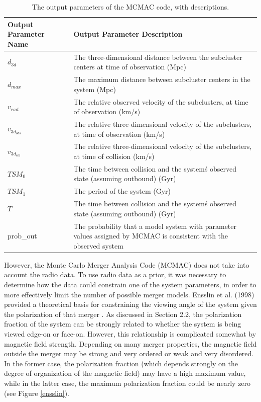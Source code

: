 \documentclass[12 pt]{article}
\renewcommand{\baselinestretch}{2}
\begin{document}
\renewcommand{\baselinestretch}{1}
\begin{table}
\begin{tabular}{|p{1.75in}|p{4in}|} \hline
\textbf{Output Parameter Name} & \textbf{Output Parameter Description} \\ \hline
$d_{3d}$ & The three-dimensional distance between the subcluster centers at time of observation (Mpc) \\ \hline
$d_{max}$ & The maximum distance between subcluster centers in the system (Mpc) \\ \hline
$v_{rad}$ & The relative observed velocity of the subclusters, at time of observation (km/s) \\ \hline
$v_{3d_{obs}}$ & The relative three-dimensional velocity of the subclusters, at time of observation (km/s) \\ \hline
$v_{3d_{col}}$ & The relative three-dimensional velocity of the subclusters, at time of collision (km/s) \\ \hline
$TSM_0$ & The time between collision and the system\'s observed state (assuming outbound) (Gyr) \\ \hline
$TSM_1$ & The period of the system (Gyr) \\ \hline
$T$ & The time between collision and the system\'s observed state (assuming outbound) (Gyr) \\ \hline
prob\_out & The probability that a model system with parameter values assigned by MCMAC is consistent with the observed system \\ \hline
\end{tabular}
\caption{The output parameters of the MCMAC code, with descriptions.}
\label{tab4}
\end{table}
\renewcommand{\baselinestretch}{2}

However, the Monte Carlo Merger Analysis Code (MCMAC) does not take into account the radio data. To use radio data as a prior, it was necessary to determine how the data could constrain one of the system parameters, in order to more effectively limit the number of possible merger models. Ensslin et al. (1998) provided a theoretical basis for constraining the viewing angle of the system given the polarization of that merger \cite{Ensslin98}. As discussed in Section 2.2, the polarization fraction of the system can be strongly related to whether the system is being viewed edge-on or face-on. However, this  relationship is complicated somewhat by magnetic field strength. Depending on many merger properties, the magnetic field outside the merger may be strong and very ordered or weak and very disordered. In the former case, the polarization fraction (which depends strongly on the degree of organization of the magnetic field) may have a high maximum value, while in the latter case, the maximum polarization fraction could be nearly zero (see Figure \ref{ensslin}).
\end{document}
